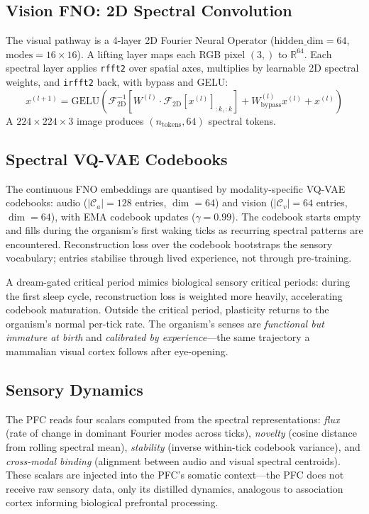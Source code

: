 \documentclass[11pt,a4paper,twocolumn]{article}
\begin{document}
\subsection{Vision FNO: 2D Spectral Convolution}

The visual pathway is a 4-layer 2D Fourier Neural Operator
($\mathrm{hidden\_dim}=64$, $\mathrm{modes}=16 \times 16$).
A lifting layer maps each RGB pixel $(3,)$ to $\mathbb{R}^{64}$. Each spectral layer applies
\texttt{rfft2} over spatial axes, multiplies by learnable 2D spectral weights, and
\texttt{irfft2} back, with bypass and GELU:
\begin{equation}
x^{(l+1)} = \mathrm{GELU}\!\left(\mathcal{F}_{\mathrm{2D}}^{-1}\!\left[W^{(l)} \cdot \mathcal{F}_{\mathrm{2D}}[x^{(l)}]_{:k,:k}\right] + W_{\mathrm{bypass}}^{(l)} x^{(l)} + x^{(l)}\right)
\end{equation}
A $224 \times 224 \times 3$ image produces $(n_{\mathrm{tokens}}, 64)$ spectral tokens.

\subsection{Spectral VQ-VAE Codebooks}

The continuous FNO embeddings are quantised by modality-specific VQ-VAE codebooks:
audio ($|\mathcal{C}_a| = 128$ entries, $\dim = 64$) and vision ($|\mathcal{C}_v| = 64$
entries, $\dim = 64$), with EMA codebook updates ($\gamma = 0.99$). The codebook starts
empty and fills during the organism's first waking ticks as recurring spectral patterns
are encountered. Reconstruction loss over the codebook bootstraps the sensory vocabulary;
entries stabilise through lived experience, not through pre-training.

A dream-gated critical period mimics biological sensory critical periods: during the first
sleep cycle, reconstruction loss is weighted more heavily, accelerating codebook maturation.
Outside the critical period, plasticity returns to the organism's normal per-tick rate.
The organism's senses are \emph{functional but immature at birth} and \emph{calibrated
by experience}---the same trajectory a mammalian visual cortex follows after eye-opening.

\subsection{Sensory Dynamics}

The PFC reads four scalars computed from the spectral representations:
\emph{flux} (rate of change in dominant Fourier modes across ticks),
\emph{novelty} (cosine distance from rolling spectral mean),
\emph{stability} (inverse within-tick codebook variance), and
\emph{cross-modal binding} (alignment between audio and visual spectral centroids).
These scalars are injected into the PFC's somatic context---the PFC does not receive raw
sensory data, only its distilled dynamics, analogous to association cortex informing
biological prefrontal processing.
\end{document}
